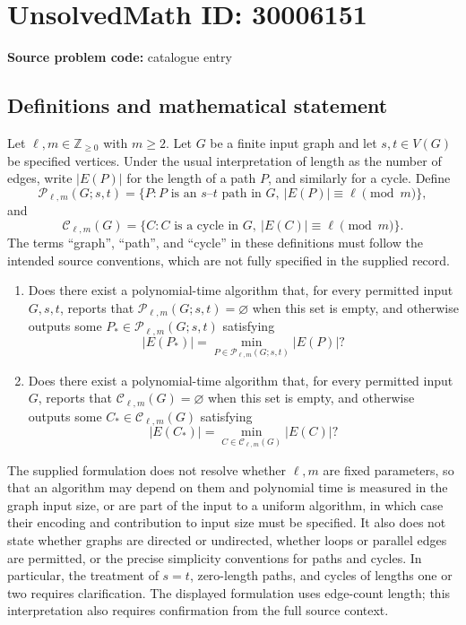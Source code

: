 \documentclass[11pt]{article}
\newcommand{\Z}{\mathbb{Z}}
\begin{document}
\section*{UnsolvedMath ID: 30006151}
\textbf{Source problem code:} catalogue entry
\subsection{Definitions and mathematical statement}
Let \(\ell,m\in\Z_{\geq 0}\) with \(m\geq 2\). Let \(G\) be a finite input graph and let \(s,t\in V(G)\) be specified vertices. Under the usual interpretation of length as the number of edges, write \(|E(P)|\) for the length of a path \(P\), and similarly for a cycle. Define
\[
\mathcal P_{\ell,m}(G;s,t)=\{P:P\text{ is an }s\text{--}t\text{ path in }G,\ |E(P)|\equiv\ell\pmod m\},
\]
and
\[
\mathcal C_{\ell,m}(G)=\{C:C\text{ is a cycle in }G,\ |E(C)|\equiv\ell\pmod m\}.
\]
The terms ``graph'', ``path'', and ``cycle'' in these definitions must follow the intended source conventions, which are not fully specified in the supplied record.

\begin{enumerate}
\item Does there exist a polynomial-time algorithm that, for every permitted input \(G,s,t\), reports that \(\mathcal P_{\ell,m}(G;s,t)=\varnothing\) when this set is empty, and otherwise outputs some \(P_*\in\mathcal P_{\ell,m}(G;s,t)\) satisfying
\[
|E(P_*)|=\min_{P\in\mathcal P_{\ell,m}(G;s,t)}|E(P)|?
\]
\item Does there exist a polynomial-time algorithm that, for every permitted input \(G\), reports that \(\mathcal C_{\ell,m}(G)=\varnothing\) when this set is empty, and otherwise outputs some \(C_*\in\mathcal C_{\ell,m}(G)\) satisfying
\[
|E(C_*)|=\min_{C\in\mathcal C_{\ell,m}(G)}|E(C)|?
\]
\end{enumerate}

The supplied formulation does not resolve whether \(\ell,m\) are fixed parameters, so that an algorithm may depend on them and polynomial time is measured in the graph input size, or are part of the input to a uniform algorithm, in which case their encoding and contribution to input size must be specified. It also does not state whether graphs are directed or undirected, whether loops or parallel edges are permitted, or the precise simplicity conventions for paths and cycles. In particular, the treatment of \(s=t\), zero-length paths, and cycles of lengths one or two requires clarification. The displayed formulation uses edge-count length; this interpretation also requires confirmation from the full source context.
\end{document}
